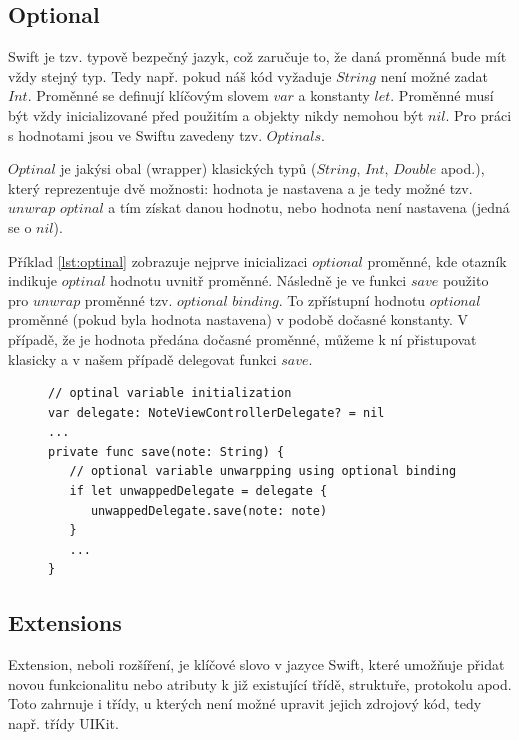\documentclass[thesis=M,czech]{FITthesis}[2012/06/26]
\begin{document}
\subsection{Optional}
Swift je tzv. typově bezpečný jazyk, což zaručuje to, že daná proměnná bude mít vždy stejný typ. Tedy např. pokud náš kód vyžaduje $String$ není možné zadat $Int$. 
Proměnné se definují klíčovým slovem $var$ a konstanty $let$. Proměnné musí být vždy inicializované před použitím a objekty nikdy nemohou být $nil$. Pro práci s hodnotami jsou ve Swiftu zavedeny tzv. $Optinals$.

$Optinal$ je jakýsi obal (wrapper) klasických typů ($String$, $Int$, $Double$ apod.), který reprezentuje dvě možnosti: hodnota je nastavena a je tedy možné tzv. $unwrap$ $optinal$ a tím získat danou hodnotu, nebo hodnota není nastavena (jedná se o $nil$). \cite{devBasics}

Příklad \ref{lst:optinal} zobrazuje nejprve inicializaci $optional$ proměnné, kde otazník indikuje $optinal$ hodnotu uvnitř proměnné. Následně je ve funkci $save$ použito pro $unwrap$ proměnné tzv. $optional$ $binding$. To zpřístupní hodnotu $optional$ proměnné (pokud byla hodnota nastavena) v podobě dočasné konstanty. V případě, že je hodnota předána dočasné proměnné, můžeme k ní přistupovat klasicky a v našem případě delegovat funkci $save$.

\begin{figure}
\begin{minipage}{\linewidth}
\begin{lstlisting}[caption={Příklad práce s Optinal},label={lst:optinal}]
// optinal variable initialization
var delegate: NoteViewControllerDelegate? = nil
...
private func save(note: String) {
   // optional variable unwarpping using optional binding
   if let unwappedDelegate = delegate {
      unwappedDelegate.save(note: note)
   }
   ...
}

\end{lstlisting}
\end{minipage}
\end{figure}


\subsection{Extensions}
Extension, neboli rozšíření, je klíčové slovo v jazyce Swift, které umožňuje přidat novou funkcionalitu nebo atributy k již existující třídě, struktuře, protokolu apod. Toto zahrnuje i třídy, u kterých není možné upravit jejich zdrojový kód, tedy např. třídy UIKit.
\end{document}
